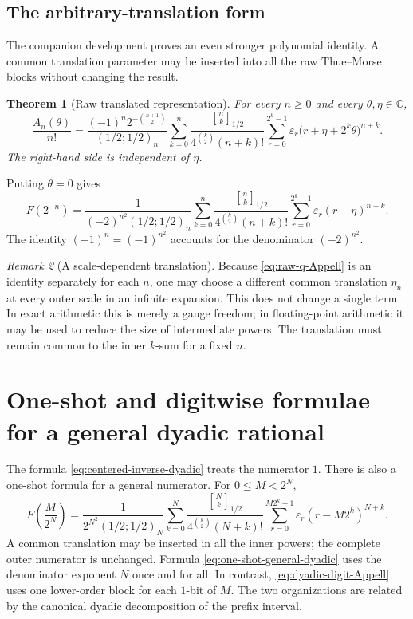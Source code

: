 \documentclass[11pt,oneside]{article}
\newtheorem{theorem}{Theorem}[section]
\theoremstyle{definition}
\theoremstyle{remark}
\newtheorem{remark}[theorem]{Remark}
\newcommand{\C}{\mathbb C}
\newcommand{\eps}{\varepsilon}
\newcommand{\poch}[3]{\left(#1;#2\right)_{#3}}
\newcommand{\qbinom}[3]{\genfrac{[}{]}{0pt}{}{#1}{#2}_{#3}}
\begin{document}
\subsection{The arbitrary-translation form}

The companion development proves an even stronger polynomial identity.  A
common translation parameter may be inserted into all the raw Thue--Morse
blocks without changing the result.

\begin{theorem}[Raw translated representation]\label{thm:raw-q-Appell}
For every $n\ge0$ and every $\theta,\eta\in\C$,
\begin{equation}\label{eq:raw-q-Appell}
\boxed{
 \frac{A_n(\theta)}{n!}
 =\frac{(-1)^n2^{-\binom{n+1}{2}}}{\poch{1/2}{1/2}{n}}
 \sum_{k=0}^{n}
 \frac{\qbinom{n}{k}{1/2}}
 {4^{\binom k2}(n+k)!}
 \sum_{r=0}^{2^k-1}
 \eps_r\bigl(r+\eta+2^k\theta\bigr)^{n+k}.}
\end{equation}
The right-hand side is independent of $\eta$.
\end{theorem}

Putting $\theta=0$ gives
\begin{equation}\label{eq:raw-inverse-dyadic}
 F(2^{-n})
 =\frac1{(-2)^{n^2}\poch{1/2}{1/2}{n}}
 \sum_{k=0}^{n}
 \frac{\qbinom{n}{k}{1/2}}
 {4^{\binom k2}(n+k)!}
 \sum_{r=0}^{2^k-1}\eps_r(r+\eta)^{n+k}.
\end{equation}
The identity $(-1)^n=(-1)^{n^2}$ accounts for the denominator
$(-2)^{n^2}$.

\begin{remark}[A scale-dependent translation]
Because \eqref{eq:raw-q-Appell} is an identity separately for each $n$, one
may choose a different common translation $\eta_n$ at every outer scale in an
infinite expansion.  This does not change a single term.  In exact arithmetic
this is merely a gauge freedom; in floating-point arithmetic it may be used to
reduce the size of intermediate powers.  The translation must remain common
to the inner $k$-sum for a fixed $n$.
\end{remark}


\section{One-shot and digitwise formulae for a general dyadic rational}

The formula \eqref{eq:centered-inverse-dyadic} treats the numerator $1$.
There is also a one-shot formula for a general numerator.  For
$0\le M<2^N$,
\begin{equation}\label{eq:one-shot-general-dyadic}
\boxed{
 F\!\left(\frac{M}{2^N}\right)
 =\frac1{2^{N^2}\poch{1/2}{1/2}{N}}
 \sum_{k=0}^{N}
 \frac{\qbinom{N}{k}{1/2}}
 {4^{\binom k2}(N+k)!}
 \sum_{r=0}^{M2^k-1}
 \eps_r(r-M2^k)^{N+k}.}
\end{equation}
A common translation may be inserted in all the inner powers; the complete
outer numerator is unchanged.  Formula \eqref{eq:one-shot-general-dyadic}
uses the denominator exponent $N$ once and for all.  In contrast,
\eqref{eq:dyadic-digit-Appell} uses one lower-order block for each $1$-bit of
$M$.  The two organizations are related by the canonical dyadic decomposition
of the prefix interval.
\end{document}
